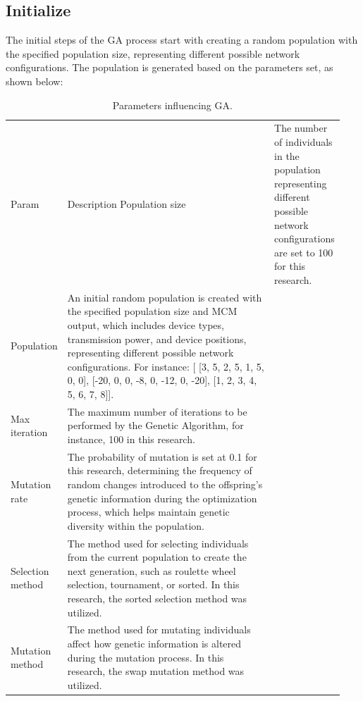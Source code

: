 \subsection{Initialize}

The initial steps of the \gls{GA} process start with creating a random population with the specified population size, representing different possible network configurations. The population is generated based on the parameters set, as shown below:

\begin{longtable}{>{\hspace{0pt}}m{0.077\linewidth}>{\hspace{0pt}}m{0.865\linewidth}}
    \label{tab:ga_parameters}\\
    \caption{Parameters influencing \gls{GA}.}\\
    \hline\hline
    Param            & Description \endfirsthead
    \hline
    Population size  & The number of individuals in the population representing different possible network configurations are set to 100 for this research.                                                                                                                                                                                             \\
    Population       & An initial random population is created with the specified population size and \gls{MCM} output, which includes device types, transmission power, and device positions, representing different possible network configurations. For instance: [ [3, 5, 2, 5, 1, 5, 0, 0], [-20, 0, 0, -8, 0, -12, 0, -20], [1, 2, 3, 4, 5, 6, 7, 8]].  \\
    Max iteration    & The maximum number of iterations to be performed by the Genetic Algorithm, for instance, 100 in this research.                                                                                                                                                                                                                   \\
    Mutation rate    & The probability of mutation is set at 0.1 for this research, determining the frequency of random changes introduced to the offspring's genetic information during the optimization process, which helps maintain genetic diversity within the population.                                                                        \\
    Selection method & The method used for selecting individuals from the current population to create the next generation, such as roulette wheel selection, tournament, or sorted. In this research, the sorted selection method was utilized.                                                                                                        \\
    Mutation method  & The method used for mutating individuals affect how genetic information is altered during the mutation process. In this research, the swap mutation method was utilized.                                                                                                                                                         \\
    \hline\hline
\end{longtable}

